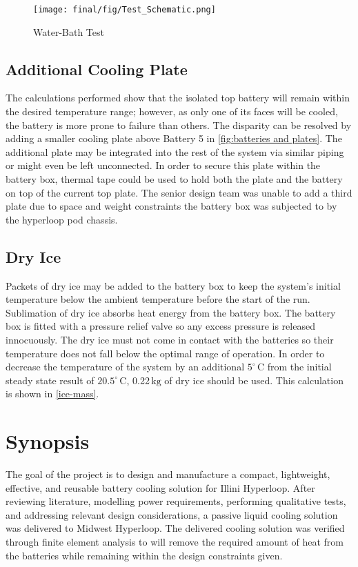 \documentclass[11pt]{article}
\numberwithin{equation}{subsection} %
\newcommand{\unit}[1]{\ensuremath{\, \mathrm{#1}}}             %
\newcommand{\degree}{^\circ}                                   %
\begin{document}
\begin{figure}[!h]
    \centering
    \texttt{[image: final/fig/Test\_Schematic.png]}
    \caption{Water-Bath Test}
    \label{fig:Water-Bath Test}
\end{figure}

\subsection{Additional Cooling Plate}\label{reco-plate}
The calculations performed show that the isolated top battery will remain within the desired temperature range; however, as only one of its faces will be cooled, the battery is more prone to failure than others. The disparity can be resolved by adding a smaller cooling plate above Battery 5 in \ref{fig:batteries and plates}. The additional plate may be integrated into the rest of the system via similar piping or might even be left unconnected. In order to secure this plate within the battery box, thermal tape could be used to hold both the plate and the battery on top of the current top plate. The senior design team was unable to add a third plate due to space and weight constraints the battery box was subjected to by the hyperloop pod chassis.

\subsection{Dry Ice}
Packets of dry ice may be added to the battery box to keep the system's initial temperature below the ambient temperature before the start of the run. Sublimation of dry ice absorbs heat energy from the battery box. The battery box is fitted with a pressure relief valve so any excess pressure is released innocuously. The dry ice must not come in contact with the batteries so their temperature does not fall below the optimal range of operation. In order to decrease the temperature of the system by an additional $5\degree\unit{C}$ from the initial steady state result of $20.5\degree\unit{C}$, 0.22\unit{kg} of dry ice should be used. This calculation is shown in \ref{ice-mass}. 


\section{Synopsis}
The goal of the project is to design and manufacture a compact, lightweight, effective, and reusable battery cooling solution for Illini Hyperloop. After reviewing literature, modelling power requirements, performing qualitative tests, and addressing relevant design considerations, a passive liquid cooling solution was delivered to Midwest Hyperloop. The delivered cooling solution was verified through finite element analysis to  will remove the required amount of heat from the batteries while remaining within the design constraints given. 
\end{document}
